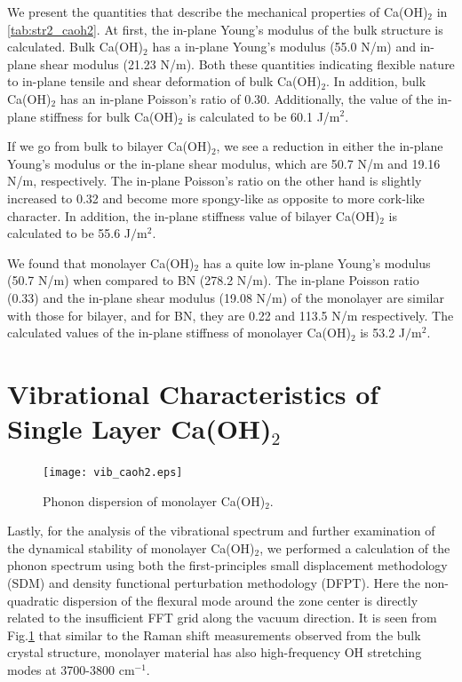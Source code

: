 We present the quantities that describe the mechanical 
properties of Ca(OH)$_2$ in \autoref{tab:str2_caoh2}. 
At first, the in-plane Young's modulus of the bulk structure is calculated. 
Bulk Ca(OH)$_2$ has a in-plane Young's modulus (55.0 N/m) and in-plane shear 
modulus (21.23 N/m). Both these quantities indicating flexible nature to in-plane 
tensile and shear deformation of bulk Ca(OH)$_2$. In addition, bulk Ca(OH)$_2$ has 
an in-plane Poisson's ratio of 0.30.  Additionally, the value of the in-plane 
stiffness for bulk Ca(OH)$_{2}$ is calculated to be 60.1 J/m$^{2}$. 

If we go from bulk to bilayer Ca(OH)$_2$, we see a reduction in either the
in-plane Young's modulus or the in-plane shear modulus, which are 50.7 N/m and 
19.16 N/m, respectively. The in-plane Poisson's ratio on the other hand is 
slightly increased to 0.32 and become more spongy-like as opposite to more 
cork-like character\cite{poisson}. In addition, the in-plane stiffness value of 
bilayer Ca(OH)$_{2}$ is calculated to be 55.6 J$/$m$^{2}$. 

We found that monolayer Ca(OH)$_2$ has a quite low in-plane Young's modulus 
(50.7 N/m) when compared to BN (278.2 N/m). The in-plane Poisson ratio (0.33) 
and the in-plane shear modulus (19.08 N/m) of the monolayer are similar with 
those for bilayer, and for BN, they are 0.22 and 113.5 N/m respectively. The 
calculated values of the in-plane stiffness of monolayer Ca(OH)$_{2}$ is 53.2 
J$/$m$^{2}$. 











\section{Vibrational Characteristics of Single Layer 
C\lowercase{a}(OH)$_{2}$}\label{stability}
\begin{figure}
\centering
\texttt{[image: vib\_caoh2.eps]}
\caption{\label{fig:vib_caoh2} Phonon dispersion of monolayer Ca(OH)$_2$.}
\end{figure}

Lastly, for the analysis of the vibrational spectrum and further examination of 
the dynamical stability of monolayer Ca(OH)$_2$, we performed a 
calculation of the phonon spectrum using both the first-principles small 
displacement methodology (SDM)\cite{alfe} and density functional perturbation 
methodology (DFPT).\cite{baroni} Here the non-quadratic dispersion of the 
flexural mode around the zone center is directly related to the insufficient 
FFT grid along the vacuum direction. It is seen from Fig.\ref{fig:vib_caoh2} that 
similar to the Raman shift measurements observed from the bulk crystal 
structure, monolayer material has also high-frequency OH stretching 
modes at 3700-3800 cm$^{-1}$. 

